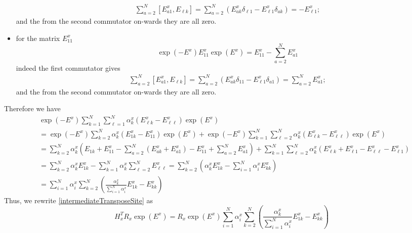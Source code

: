 \documentclass[11pt]{article}
\numberwithin{equation}{section}
\numberwithin{equation}{subsection}
\begin{document}
\begin{itemize}
\begin{align*}
\sum_{a=2}^{N}\left[E_{a1}^{x},E_{\ell k}\right]=\sum_{a=2}^{N}\left(E_{ak}^{x}\delta_{\ell 1}-E_{\ell 1}^{x}\delta_{ak}\right)=-E_{\ell 1}^{x};
\end{align*}
and the from the second commutator on-wards they are all zero.
\item for the matrix $E_{11}^{x}$
\begin{equation}
    \exp{(-E^{x})}E_{11}^{x}\exp{(E^{x})}=E_{11}^{x}-\sum_{a=2}^{N}E_{a1}^{x}
\end{equation}
indeed the first commutator gives
\begin{align*}
\sum_{a=2}^{N}\left[E_{a1}^{x},E_{\ell k}\right]=\sum_{a=2}^{N}\left(E_{ak}^{x}\delta_{11}-E_{\ell 1}^{x}\delta_{a1}\right)=\sum_{a=2}^{N}E_{a1}^{x};
\end{align*}
and the from the second commutator on-wards they are all zero.
\end{itemize}
Therefore we have
\begin{equation}
\begin{split}
    &\exp{(-E^{x})}\sum_{k=1}^{N}\sum_{\ell=1}^{N}\alpha_{k}^{x}\left(E_{\ell k}^{x}-E_{\ell\ell}^{x}\right)\exp{(E^{x})}\\&=
     \exp{(-E^{x})}\sum_{k=2}^{N}\alpha_{k}^{x}\left(E_{1k}^{x}-E_{11}^{x}\right)\exp{(E^{x})}
     + \exp{(-E^{x})}\sum_{k=1}^{N}\sum_{\ell=2}^{N}\alpha_{k}^{x}\left(E_{\ell k}^{x}-E_{\ell\ell}^{x}\right)\exp{(E^{x})}
     \\&=
     \sum_{k=2}^{N}\alpha_{k}^{x}\left(E_{1k}+E_{11}^{x}-\sum_{a=2}^{N}(E_{ak}^{x}+E_{a1}^{x})-E_{11}^{x}+\sum_{a=2}^{N}E_{a1}^{x}\right)+\sum_{k=1}^{N}\sum_{\ell =2}^{N}\alpha_{k}^{x}\left(E_{\ell k}^{x}+E_{\ell 1}^{x}-E_{\ell\ell}^{x}-E_{\ell 1}^{x}\right)
     \\&=
\sum_{k=2}^{N}\alpha_{k}^{x}E_{1k}^{x}-\sum_{k=1}^{N}\alpha_{k}^{x}\sum_{\ell=2}^{N}E_{\ell\ell}^{x}
=
     \sum_{k=2}^{N}\left(\alpha_{k}^{x}E_{1k}^{x}-\sum_{i=1}^{N}\alpha_{i}^{x}E_{kk}^{x}\right)
\\&=
\sum_{i=1}^{N}\alpha_{i}^{x}\sum_{k=2}^{N}\left(\frac{\alpha_{k}^{x}}{\sum_{i=1}^{N}\alpha_{i}^{x}}E_{1k}^{x}-E_{kk}^{x}\right)
    \end{split}
\end{equation}
Thus, we rewrite \eqref{intermediateTransposeSite} as
\begin{equation}\label{siteHadamardI}
H_{x}^{T}R_{x}\exp{(E^{x})}=R_{x}\exp{(E^{x})}\sum_{i=1}^{N}\alpha_{i}^{x}\sum_{k=2}^{N}\left(\frac{\alpha_{k}^{x}}{\sum_{i=1}^{N}\alpha_{i}^{x}}E_{1k}^{x}-E_{kk}^{x}\right)
\end{equation}
\end{document}
